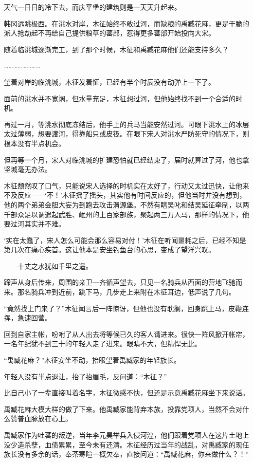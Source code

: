 天气一日日的冷下去，而庆平堡的建筑则是一天天升起来。

韩冈远眺极西。在洮水对岸，木征始终不敢过河，而缺粮的禹臧花麻，更是干脆的派人抢劫起不再给自己提供粮草的蕃部，惹得更多蕃部开始投向大宋。

随着临洮城逐渐完工，到了那个时候，木征和禹臧花麻他们还能支持多久？

……………………

望着对岸的临洮城，木征发着怔，已经有半个时辰没有动弹上一下了。

面前的洮水并不宽阔，但水量充足，木征想过河，但他始终找不到一个合适的时机。

再过一月，等洮水彻底冻结后，他手上的兵马当能安然过河。可眼下洮水上的冰层太过薄弱，想要渡河，得靠船只或皮筏。在眼下宋人对洮水严防死守的情况下，则根本没有半点机会。

但再等一个月，宋人对临洮城的扩建恐怕就已经结束了，届时就算过了河，他也拿坚城毫无办法。

木征颓然叹了口气，只能说宋人选择的时机实在太好了，行动又太过迅快，让他来不及反应——‘不！’木征摇了摇头，其实他有时间反应的，但他当时并没有想到，他的两个弟弟会胆大妄为到跑去攻击渭源堡。不然有瞎吴叱和结吴延征牵制，以两千部众足以调遣起武胜、岷州的上百家部族，聚起两三万人马，那样的情况下，他要过河其实并不难。

‘实在太蠢了，宋人怎么可能会那么容易对付！’木征在听闻噩耗之后，已经不知是第几次在痛心疾首。这让他本是安坐钓鱼台的心思，变成了望洋兴叹。

——十丈之水犹如千里之遥。

蹄声从身后传来，周围的亲卫一齐循声望去，只见一名骑兵从西面的营地飞驰而来。那名骑兵冲到近前，跳下马，几步走上来附在木征耳边，低声说了几句。

“竟然找上门来了？”木征闻言后一阵惊讶，但他也没有耽搁，回身跳上马，皮鞭连挥，急速回营。

回到自家主帐，吩咐了从人出去将等候已久的客人请进来。很快一阵风掀开帐帘，一名年纪犹不到三十的年轻人走了进来。眼睛不大，但精悍无比。

“禹臧花麻？”木征安坐不动，抬眼望着禹臧家的年轻族长。

年轻人没有半点退让，抬了抬眉毛，反问道：“木征？”

比自己小了一辈直接叫着名字，木征微感不快，但还是示意禹臧花麻坐下来说话。

禹臧花麻大模大样的做了下来。他禹臧家能背弃本族，投靠党项人，当然不会对什么赞普血脉放在心上。

禹臧家作为吐蕃的叛逆，当年李元昊举兵入侵河湟，他们跟着党项人在这片土地上没少造杀孽，血债累累，至今未有还清。木征经历过当年的战乱，对禹臧家的现任族长没有多余的话，奉茶寒暄一概欠奉，直接问道：“禹臧花麻，你来做什么？！”

